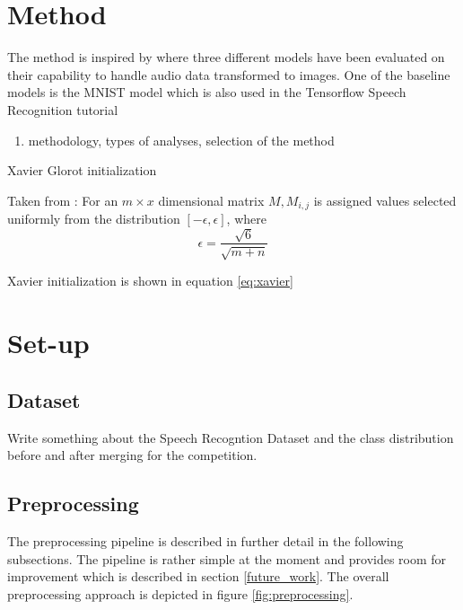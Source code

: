 \documentclass{article}
\theoremstyle{definition}
\theoremstyle{remark}
\begin{document}
\section{Method}

The method is inspired by \cite{gouda2018speech} where three different models have been evaluated on their capability to handle audio data transformed to images. One of the baseline models is the MNIST model which is also used in the Tensorflow Speech Recognition tutorial \cite{tutorial}


\begin{enumerate}
	\item methodology, types of analyses, selection of the method
\end{enumerate}


Xavier Glorot initialization \cite{glorot2010understanding}

Taken from \cite{gouda2018speech}: For an $m \times x$ dimensional matrix $M, M_{i,j}$ is assigned values selected uniformly from the distribution $[-\epsilon, \epsilon]$, where
\begin{equation} \label{eq:xavier}
\epsilon = \frac{\sqrt{6}}{\sqrt{m + n}}
\end{equation}


Xavier initialization is shown in equation \ref{eq:xavier}



\section{Set-up}



\subsection{Dataset}

Write something about the Speech Recogntion Dataset and the class distribution before and after merging for the competition.


\subsection{Preprocessing}

The preprocessing pipeline is described in further detail in the following subsections. The pipeline is rather simple at the moment and provides room for improvement which is described in section \ref{future_work}. The overall preprocessing approach is depicted in figure \ref{fig:preprocessing}.
\end{document}
